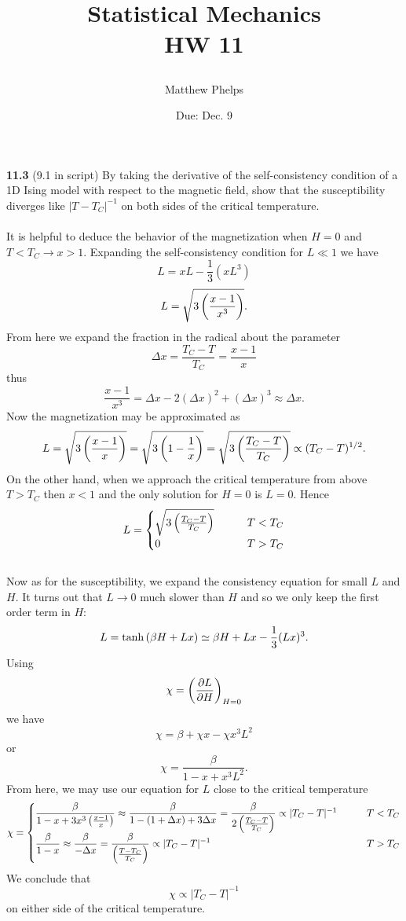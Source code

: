 \documentclass[11pt,letterpaper]{article}
\title{\begin{spacing}{1.2}Statistical Mechanics\\HW 11\end{spacing}}
\author{Matthew Phelps}
\date{Due: Dec. 9}
\begin{document}
\maketitle

\benum
  	\item[\textbf{11.3}]
	(9.1 in script)
	By taking the derivative of the self-consistency condition of a 1D Ising model with respect to the
	magnetic field, show that the susceptibility diverges like $|T-T_C|^{-1}$ on both sides of the critical
	temperature.
 	\\ \\ 
	It is helpful to deduce the behavior of the magnetization when $H=0$ and $T<T_C \rightarrow x>1$.
	Expanding the self-consistency condition for $L\ll 1$ we have
	\[
		L = xL -\frac{1}{3}(xL^3)
	\]
	\[
		L = \sqrt{3\pfrac{x-1}{x^3}}.
	\]
	From here we expand the fraction in the radical about the parameter 
	\[
		\Delta x = \frac{T_C-T}{T_C}  = \frac{x-1}{x}
	\]
	thus
	\[
		\frac{x-1}{x^3} = \Delta x - 2(\Delta x)^2 +(\Delta x)^3 \approx \Delta x.
	\]
	Now the magnetization may be approximated as
	\[
		L = \sqrt{ 3\pfrac{x-1}{x}} = \sqrt{3\plr{1-\frac{1}{x}}} = \sqrt{3\pfrac{T_C-T}{T_C}} 
		\propto (T_C-T)^{1/2}.
	\]
	On the other hand, when we approach the critical temperature from above $T>T_C$ then 
	$x<1$ and the only solution for $H=0$ is $L=0$. Hence
	\[
		L = \begin{cases} \sqrt{3\pfrac{T_C-T}{T_C}}&\qquad T<T_C \\
			0&\qquad T>T_C
			\end{cases}
	\]
	\\
	Now as for the susceptibility, we expand the consistency equation for small $L$ and $H$. It turns
	out that $L\to 0$ much slower than $H$ and so we only keep the first order term in $H$:
	\[
		L= \tanh \plr{\beta H + Lx} \simeq \beta H + Lx -\frac{1}{3}(Lx)^3.
	\]
	Using
	\[
		\chi  = \plr{\pdiff[L]{H}}_{H=0}
	\]
	we have
	\[
		\chi =  \beta +\chi x-\chi x^3 L^2
	\]
	or
	\[
		\chi = \frac{\beta}{1-x+x^3L^2}.
	\]
	From here, we may use our equation for $L$ close to the critical temperature
	\[
		\chi = \begin{cases}\ds \frac{\beta}{1-x+3x^3\pfrac{x-1}{x} }\approx \frac{\beta}{1-
		(1+\Delta x)+3\Delta x} = \frac{\beta}{2\pfrac{T_C-T}{T_C}} \propto |T_C-T|^{-1}
		 &\qquad T<T_C \\
		\ds \frac{\beta}{1-x}\approx \frac{\beta}{-\Delta x} = \frac{\beta}{\pfrac{T-T_C}{T_C}} \propto
		|T_C-T|^{-1}
		&\qquad T>T_C
		\end{cases}
	\]
	We conclude that
	\[
		\chi \propto |T_C-T|^{-1}
	\]
	on either side of the critical temperature.
	\\ \\
	
\end{document}
